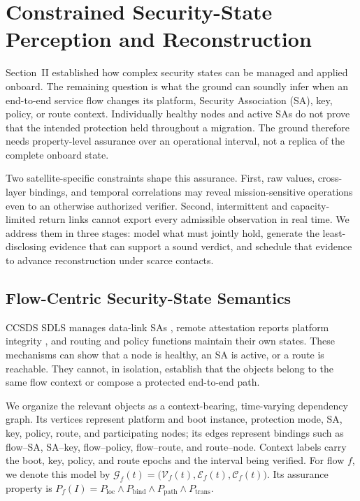 \documentclass[journal]{IEEEtran}
\begin{document}
\section{Constrained Security-State Perception and Reconstruction} 
\label{sec:point2}
Section~II established how complex security states can be managed and applied
onboard. The remaining question is what the ground can soundly infer when an
end-to-end service flow changes its platform, Security Association (SA), key,
policy, or route context. Individually healthy nodes and active SAs do not prove
that the intended protection held throughout a migration. The ground therefore
needs property-level assurance over an operational interval, not a replica of
the complete onboard state.

Two satellite-specific constraints shape this assurance. First, raw values,
cross-layer bindings, and temporal correlations may reveal mission-sensitive
operations even to an otherwise authorized verifier. Second, intermittent and
capacity-limited return links cannot export every admissible observation in real
time. We address them in three stages: model what must jointly hold, generate
the least-disclosing evidence that can support a sound verdict, and schedule
that evidence to advance reconstruction under scarce contacts.

\subsection{Flow-Centric Security-State Semantics}
CCSDS SDLS manages data-link SAs \cite{ccsds2022sdls}, remote attestation
reports platform integrity \cite{rfc9334rats}, and routing and policy functions
maintain their own states. These mechanisms can show that a node is healthy, an
SA is active, or a route is reachable. They cannot, in isolation, establish that
the objects belong to the same flow context or compose a protected end-to-end
path.

We organize the relevant objects as a context-bearing, time-varying dependency
graph. Its vertices represent platform and boot instance, protection mode, SA,
key, policy, route, and participating nodes; its edges represent bindings such
as flow--SA, SA--key, flow--policy, flow--route, and route--node. Context labels
carry the boot, key, policy, and route epochs and the interval being verified.
For flow \(f\), we denote this model by
\(\mathcal{G}_f(t)=\bigl(\mathcal{V}_f(t),\mathcal{E}_f(t),
\mathcal{C}_f(t)\bigr)\). Its assurance property is
\(P_f(I)=P_{\mathrm{loc}}\land P_{\mathrm{bind}}\land
P_{\mathrm{path}}\land P_{\mathrm{trans}}\).
\end{document}
